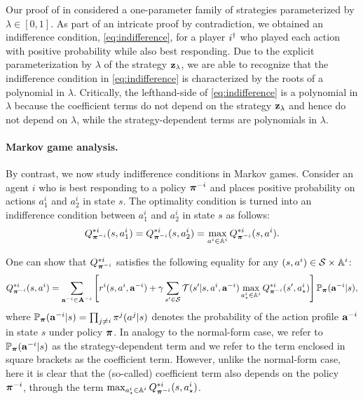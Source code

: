 Our proof of  in  considered a one-parameter family of strategies parameterized by $\lambda \in [ 0, 1]$. As part of an intricate proof by contradiction, we obtained an indifference condition, \eqref{eq:indifference}, for a player $i^{\dagger}$ who played each action with positive probability while also best responding. Due to the explicit parameterization by $\lambda$ of the strategy ${\mathbf{z}}_{\lambda}$, we are able to recognize that the indifference condition in \eqref{eq:indifference} is characterized by the roots of a polynomial in $\lambda$. Critically, the lefthand-side of \eqref{eq:indifference} is a polynomial in $\lambda$ because the coefficient terms do not depend on the strategy ${\mathbf{z}}_{\lambda}$ and hence do not depend on $\lambda$, while the strategy-dependent terms are polynomials in $\lambda$. %

\paragraph{Markov game analysis.} %
By contrast, we now study indifference conditions in Markov games. Consider an agent $i$ who is best responding to a policy $\bm{\pi}^{-i}$ and places positive probability on actions $a^i_1$ and $a^i_2$ in state $s$. The optimality condition is turned into an indifference condition between $a^i_1$ and $a^i_2$ in state $s$ as follows:
\[
Q^{*i}_{\bm{\pi}^{-i}} ( s, a^i_1 ) = Q^{*i}_{\bm{\pi}^{-i}} ( s, a^i_2 ) = \max_{a^i \in \mathbb{A}^i } Q^{*i}_{\bm{\pi}^{-i}} ( s, a^i ) .
\]

One can show that $Q^{*i}_{ \bm{\pi}^{-i }}$ satisfies the following equality for any $(s,a^i) \in \mathcal{S} \times \mathbb{A}^i$:
\[
Q^{*i}_{\bm{\pi}^{-i}} ( s, a^i ) = \sum_{{\mathbf{a}}^{-i} \in {\mathbf{A}}^{-i}} \left[ r^i ( s, a^i, {\mathbf{a}}^{-i} ) + \gamma \sum_{ s' \in \mathcal{S} } \mathcal{T} ( s' | s, a^i, {\mathbf{a}}^{-i} ) \max_{ a^i_{\star} \in \mathbb{A}^i } Q^{*i}_{\bm{\pi}^{-i}} ( s' , a^i_{\star} )    \right] \mathbb{P}_{\bm{\pi}} ( {\mathbf{a}}^{-i} | s ) ,
\]
where $\mathbb{P}_{\bm{\pi}} ( {\mathbf{a}}^{-i} | s ) = \prod_{j \not= i } \pi^j ( a^j | s )$ denotes the probability of the action profile ${\mathbf{a}}^{-i}$ in state $s$ under policy $\bm{\pi}$. In analogy to the normal-form case, we refer to $ \mathbb{P}_{\bm{\pi}} ( {\mathbf{a}}^{-i} | s )$ as the strategy-dependent term and we refer to the term enclosed in square brackets as the coefficient term. However, unlike the normal-form case, here it is clear that the (so-called) coefficient term also depends on the policy $\bm{\pi}^{-i}$, through the term $\max_{a^i_{\star} \in \mathbb{A}^i } Q^{*i}_{\bm{\pi}^{-i}} ( s, a^i_{\star})$. 

